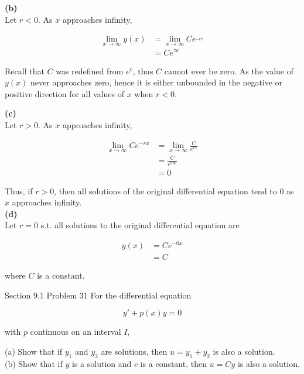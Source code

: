 \documentclass{article}
\begin{document}
    \textbf{(b)} \\
    Let $r < 0$. As $x$ approaches infinity,

    \begin{align*}
        \lim_{x\to\infty}y(x)   &= \lim_{x\to\infty} Ce^_{-rx} \\
                                &= Ce^{\infty}
    \end{align*}

    Recall that $C$ was redefined from $e^c$, thus $C$ cannot ever be zero. As the value of $y(x)$ never approaches zero, hence it is either unbounded in the negative or positive direction for all values of $x$ when
    $r < 0$.

    \textbf{(c)} \\

    Let $r > 0$. As $x$ approaches infinity,

    \begin{align*}
        \lim_{x\to\infty} Ce^{-rx} &= \lim_{x\to\infty} \frac{C}{e^{rx}} \\
                                    &= \frac{C}{e^{r\infty}} \\
                                    &= 0
    \end{align*}

    Thus, if $r > 0$, then all solutions of the original differential equation tend to 0 as $x$ approaches infinity. \\

    \textbf{(d)} \\

    Let $r = 0$ s.t. all solutions to the original differential equation are

    \begin{align*}
        y(x)    &= Ce^{-0x} \\
                &= C
    \end{align*}

    where $C$ is a constant.



    \pagebreak
    \thispagestyle{3}

    \begin{tbhtheorem}{Section 9.1 Problem 31}
        For the differential equation

        \[
            y' + p(x)y = 0
        \]

        with $p$ continuous on an interval $I$,

        (a) Show that if $y_1$ and $y_2$ are solutions, then $u=y_1 + y_2$ is also a solution. \\
        (b) Show that if $y$ is a solution and $c$ is a constant, then $u=Cy$ is also a solution.
    \end{tbhtheorem}
\end{document}
